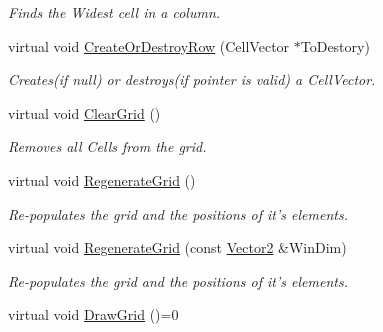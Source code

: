 \begin{DoxyCompactItemize}
\begin{DoxyCompactList}\small\item\em Finds the Widest cell in a column. \item\end{DoxyCompactList}\item 
\hypertarget{classphys_1_1UI_1_1CellGrid_af4f183946fb12cb9150b337c17343c31}{
virtual void \hyperlink{classphys_1_1UI_1_1CellGrid_af4f183946fb12cb9150b337c17343c31}{CreateOrDestroyRow} (CellVector $\ast$ToDestory)}
\label{classphys_1_1UI_1_1CellGrid_af4f183946fb12cb9150b337c17343c31}

\begin{DoxyCompactList}\small\item\em Creates(if null) or destroys(if pointer is valid) a CellVector. \item\end{DoxyCompactList}\item 
\hypertarget{classphys_1_1UI_1_1CellGrid_a62025df19045011c3ef7958c253f8f3c}{
virtual void \hyperlink{classphys_1_1UI_1_1CellGrid_a62025df19045011c3ef7958c253f8f3c}{ClearGrid} ()}
\label{classphys_1_1UI_1_1CellGrid_a62025df19045011c3ef7958c253f8f3c}

\begin{DoxyCompactList}\small\item\em Removes all Cells from the grid. \item\end{DoxyCompactList}\item 
\hypertarget{classphys_1_1UI_1_1CellGrid_a1fecbe653e802df38b5bb416a73efda9}{
virtual void \hyperlink{classphys_1_1UI_1_1CellGrid_a1fecbe653e802df38b5bb416a73efda9}{RegenerateGrid} ()}
\label{classphys_1_1UI_1_1CellGrid_a1fecbe653e802df38b5bb416a73efda9}

\begin{DoxyCompactList}\small\item\em Re-\/populates the grid and the positions of it's elements. \item\end{DoxyCompactList}\item 
\hypertarget{classphys_1_1UI_1_1CellGrid_ab426bff9fe6c637aa4438fd00cdde71b}{
virtual void \hyperlink{classphys_1_1UI_1_1CellGrid_ab426bff9fe6c637aa4438fd00cdde71b}{RegenerateGrid} (const \hyperlink{classphys_1_1Vector2}{Vector2} \&WinDim)}
\label{classphys_1_1UI_1_1CellGrid_ab426bff9fe6c637aa4438fd00cdde71b}

\begin{DoxyCompactList}\small\item\em Re-\/populates the grid and the positions of it's elements. \item\end{DoxyCompactList}\item 
\hypertarget{classphys_1_1UI_1_1CellGrid_ada5c15ae1b0372277d1bde05e348ccfd}{
virtual void \hyperlink{classphys_1_1UI_1_1CellGrid_ada5c15ae1b0372277d1bde05e348ccfd}{DrawGrid} ()=0}
\label{classphys_1_1UI_1_1CellGrid_ada5c15ae1b0372277d1bde05e348ccfd}


\end{DoxyCompactItemize}
